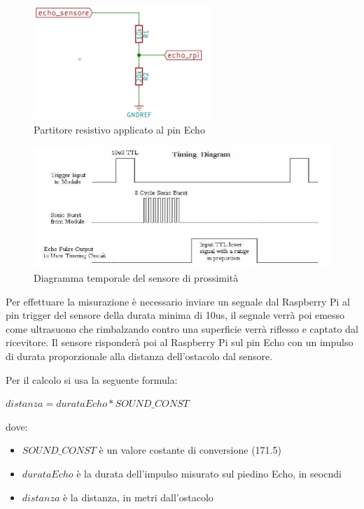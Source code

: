 \documentclass[12pt]{article}
\newcommand{\imgszland}{0.6\textwidth}
\newcommand{\raspi}{Raspberry Pi}
\begin{document}
\begin{figure}[h]
\includegraphics[width=\imgszland]{partitore}
\centering
\caption{Partitore resistivo applicato al pin Echo}
\label{fig:partitore}
\end{figure}

\begin{figure}[h]
\includegraphics[width=\linewidth]{us_diagram}
\centering
\caption{Diagramma temporale del sensore di prossimità}
\label{fig:usdiagram}
\end{figure}

Per effettuare la misurazione è necessario inviare un segnale dal Raspberry Pi al pin trigger del sensore della durata minima di 10us, il segnale verrà poi emesso come ultrasuono che rimbalzando contro una superficie verrà riflesso e captato dal ricevitore. 
Il sensore risponderà poi al \raspi{} sul pin Echo con un impulso di durata proporzionale alla distanza dell'ostacolo dal sensore.

Per il calcolo si usa la seguente formula:\\
\begin{center}
$ distanza = durataEcho * SOUND\_CONST $
\end{center}
dove:
\begin{itemize}
\item $SOUND\_CONST$ è un valore costante di conversione (171.5)
\item $durataEcho$ è la durata dell'impulso misurato sul piedino Echo, in seocndi
\item $distanza$ è la distanza, in metri dall'ostacolo
\end{itemize}
\end{document}
